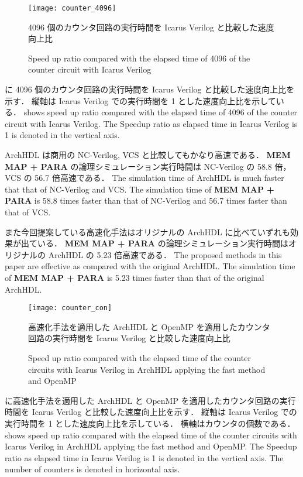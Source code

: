 \begin{figure}[tb]
 \centering
 \texttt{[image: counter\_4096]}
 \caption{4096 個のカウンタ回路の実行時間を Icarus Verilog と比較した速度向上比}
\fi
 \caption{Speed up ratio compared with the elapsed time of 4096 of the counter circuit with Icarus Verilog}
 \label{fig:counter4096}
\end{figure}

 に 4096 個のカウンタ回路の実行時間を Icarus Verilog と比較した速度向上比を示す．
縦軸は Icarus Verilog での実行時間を 1 とした速度向上比を示している．
\fi
{} shows speed up ratio compared with the elapsed time of 4096 of the counter circuit with Icarus Verilog.
The Speedup ratio as elapsed time in Icarus Verilog is 1 is denoted in the vertical axis.

ArchHDL は商用の NC-Verilog, VCS と比較してもかなり高速である．
\textbf{MEM MAP + PARA} の論理シミュレーション実行時間は NC-Verilog の 58.8 倍，VCS の 56.7 倍高速である．
\fi
The simulation time of ArchHDL is much faster that that of NC-Verilog and VCS.
The simulation time of \textbf{MEM MAP + PARA} is 58.8 times faster than that of NC-Verilog and 56.7 times faster than that of VCS.

また今回提案している高速化手法はオリジナルの ArchHDL に比べていずれも効果が出ている．
\textbf{MEM MAP + PARA} の論理シミュレーション実行時間はオリジナルの ArchHDL の 5.23 倍高速である．
\fi
The proposed methods in this paper are effective as compared with the original ArchHDL.
The simulation time of \textbf{MEM MAP + PARA} is 5.23 times faster than that of the original ArchHDL.



\begin{figure}[tb]
 \centering
 \texttt{[image: counter\_con]}
 \caption{高速化手法を適用した ArchHDL と OpenMP を適用したカウンタ回路の実行時間を Icarus Verilog と比較した速度向上比}
\fi
 \caption{Speed up ratio compared with the elapsed time of the counter circuits with Icarus Verilog in ArchHDL applying the fast method and OpenMP}
 \label{fig:counter_con}
\end{figure}

 に高速化手法を適用した ArchHDL と OpenMP を適用したカウンタ回路の実行時間を Icarus Verilog と比較した速度向上比を示す．
縦軸は Icarus Verilog での実行時間を 1 とした速度向上比を示している．
横軸はカウンタの個数である．
\fi
{} shows speed up ratio compared with the elapsed time of the counter circuits with Icarus Verilog in ArchHDL applying the fast method and OpenMP.
The Speedup ratio as elapsed time in Icarus Verilog is 1 is denoted in the vertical axis.
The number of counters is denoted in horizontal axis.

